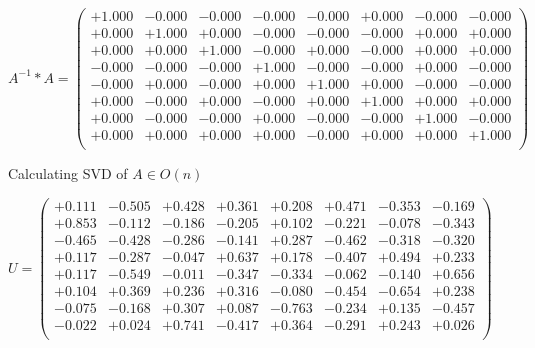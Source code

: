 \documentclass[9pt]{article}
\theoremstyle{plain}
\theoremstyle{definition}
\theoremstyle{remark}
\numberwithin{equation}{section}
\begin{document}
$A^{-1} *A = \left(
\begin{array}{
cccccccc}
+1.000 & -0.000 & -0.000 & -0.000 & -0.000 & +0.000 & -0.000 & -0.000 \\
+0.000 & +1.000 & +0.000 & -0.000 & -0.000 & -0.000 & +0.000 & +0.000 \\
+0.000 & +0.000 & +1.000 & -0.000 & +0.000 & -0.000 & +0.000 & +0.000 \\
-0.000 & -0.000 & -0.000 & +1.000 & -0.000 & -0.000 & +0.000 & -0.000 \\
-0.000 & +0.000 & -0.000 & +0.000 & +1.000 & +0.000 & -0.000 & -0.000 \\
+0.000 & -0.000 & +0.000 & -0.000 & +0.000 & +1.000 & +0.000 & +0.000 \\
+0.000 & -0.000 & -0.000 & +0.000 & -0.000 & -0.000 & +1.000 & -0.000 \\
+0.000 & +0.000 & +0.000 & +0.000 & -0.000 & +0.000 & +0.000 & +1.000 \\
\end{array}
\right)$ \newline 

Calculating SVD of  $A \in O(n)$

$U = \left(
\begin{array}{
cccccccc}
+0.111 & -0.505 & +0.428 & +0.361 & +0.208 & +0.471 & -0.353 & -0.169 \\
+0.853 & -0.112 & -0.186 & -0.205 & +0.102 & -0.221 & -0.078 & -0.343 \\
-0.465 & -0.428 & -0.286 & -0.141 & +0.287 & -0.462 & -0.318 & -0.320 \\
+0.117 & -0.287 & -0.047 & +0.637 & +0.178 & -0.407 & +0.494 & +0.233 \\
+0.117 & -0.549 & -0.011 & -0.347 & -0.334 & -0.062 & -0.140 & +0.656 \\
+0.104 & +0.369 & +0.236 & +0.316 & -0.080 & -0.454 & -0.654 & +0.238 \\
-0.075 & -0.168 & +0.307 & +0.087 & -0.763 & -0.234 & +0.135 & -0.457 \\
-0.022 & +0.024 & +0.741 & -0.417 & +0.364 & -0.291 & +0.243 & +0.026 \\
\end{array}
\right)$ \newline 
\end{document}
